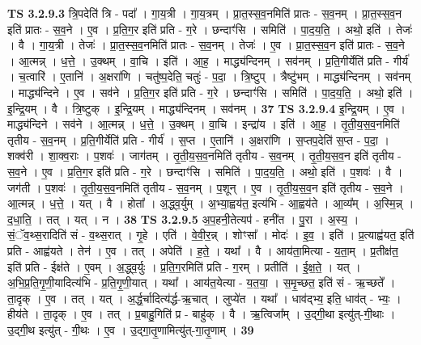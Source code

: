 \documentclass[17pt]{extarticle}
\begin{document}
                  \newline
                                \textbf{ TS 3.2.9.3} \newline
                  त्रि॒पदेति॑ त्रि - पदा᳚ । गा॒य॒त्री । गा॒य॒त्रम् । प्रा॒त॒स्स॒व॒नमिति॑ प्रातः - स॒व॒नम् । प्रा॒त॒स्स॒व॒न इति॑ प्रातः - स॒व॒ने । ए॒व । प्र॒ति॒ग॒र इति॑ प्रति - ग॒रे । छन्दाꣳ॑सि । समिति॑ । पा॒द॒य॒ति॒ । अथो॒ इति॑ । तेजः॑ । वै । गा॒य॒त्री । तेजः॑ । प्रा॒त॒स्स॒व॒नमिति॑ प्रातः - स॒व॒नम् । तेजः॑ । ए॒व । प्रा॒त॒स्स॒व॒न इति॑ प्रातः - स॒व॒ने । आ॒त्मन्न् । ध॒त्ते॒ । उ॒क्थम् । वा॒चि । इति॑ । आ॒ह॒ । माद्ध्य॑न्दिनम् । सव॑नम् । प्र॒ति॒गीर्येति॑ प्रति - गीर्य॑ । च॒त्वारि॑ । ए॒तानि॑ । अ॒क्षरा॑णि । चतु॑ष्प॒देति॒ चतुः॑ - प॒दा॒ । त्रि॒ष्टुप् । त्रैष्टु॑भम् । माद्ध्य॑न्दिनम् । सव॑नम् । माद्ध्य॑न्दिने । ए॒व । सव॑ने । प्र॒ति॒ग॒र इति॑ प्रति - ग॒रे । छन्दाꣳ॑सि । समिति॑ । पा॒द॒य॒ति॒ । अथो॒ इति॑ । इ॒न्द्रि॒यम् । वै । त्रि॒ष्टुक् । इ॒न्द्रि॒यम् । माद्ध्य॑न्दिनम् । सव॑नम् । \textbf{  37} \newline
                  \newline
                                \textbf{ TS 3.2.9.4} \newline
                  इ॒न्द्रि॒यम् । ए॒व । माद्ध्य॑न्दिने । सव॑ने । आ॒त्मन्न् । ध॒त्ते॒ । उ॒क्थम् । वा॒चि । इन्द्रा॑य । इति॑ । आ॒ह॒ । तृ॒ती॒य॒स॒व॒नमिति॑ तृतीय - स॒व॒नम् । प्र॒ति॒गीर्येति॑ प्रति - गीर्य॑ । स॒प्त । ए॒तानि॑ । अ॒क्षरा॑णि । स॒प्तप॒देति॑ स॒प्त - प॒दा॒ । शक्व॑री । शा॒क्व॒राः । प॒शवः॑ । जाग॑तम् । तृ॒ती॒य॒स॒व॒नमिति॑ तृतीय - स॒व॒नम् । तृ॒ती॒य॒स॒व॒न इति॑ तृतीय - स॒व॒ने । ए॒व । प्र॒ति॒ग॒र इति॑ प्रति - ग॒रे । छन्दाꣳ॑सि । समिति॑ । पा॒द॒य॒ति॒ । अथो॒ इति॑ । प॒शवः॑ । वै । जग॑ती । प॒शवः॑ । तृ॒ती॒य॒स॒व॒नमिति॑ तृतीय - स॒व॒नम् । प॒शून् । ए॒व । तृ॒ती॒य॒स॒व॒न इति॑ तृतीय - स॒व॒ने । आ॒त्मन्न् । ध॒त्ते॒ । यत् । वै । होता᳚ । अ॒द्ध्व॒र्युम् । अ॒भ्या॒ह्वय॑त॒ इत्य॑भि - आ॒ह्वय॑ते । आ॒व्य᳚म् । अ॒स्मि॒न्न् । द॒धा॒ति॒ । तत् । यत् । न । \textbf{  38} \newline
                  \newline
                                \textbf{ TS 3.2.9.5} \newline
                  अ॒प॒हनी॒तेत्यप॑ - हनी॑त । पु॒रा । अ॒स्य॒ । सं॒ॅव॒थ्स॒रादिति॑ सं - व॒थ्स॒रात् । गृ॒हे । एति॑ । वे॒वी॒र॒न्न् । शोꣳसा᳚ । मोदः॑ । इ॒व॒ । इति॑ । प्र॒त्याह्व॑यत॒ इति॑ प्रति - आह्व॑यते । तेन॑ । ए॒व । तत् । अपेति॑ । ह॒ते॒ । यथा᳚ । वै । आय॑ता॒मित्या - य॒ता॒म् । प्र॒तीक्ष॑त॒ इति॑ प्रति - ईक्ष॑ते । ए॒वम् । अ॒द्ध्व॒र्युः । प्र॒ति॒ग॒रमिति॑ प्रति - ग॒रम् । प्रतीति॑ । ई॒क्ष॒ते॒ । यत् । अ॒भि॒प्र॒ति॒गृ॒णी॒यादित्य॑भि - प्र॒ति॒गृ॒णी॒यात् । यथा᳚ । आय॑त॒येत्या - य॒त॒या॒ । स॒मृ॒च्छत॒ इति॑ सं - ऋ॒च्छते᳚ । ता॒दृक् । ए॒व । तत् । यत् । अ॒र्द्ध॒र्चादित्य॑र्द्ध-ऋ॒चात् । लुप्ये॑त । यथा᳚ । धाव॑द्भ्य॒ इति॒ धाव॑त् - भ्यः॒ । हीय॑ते । ता॒दृक् । ए॒व । तत् । प्र॒बाहु॒गिति॑ प्र - बाहु॑क् । वै । ऋ॒त्विजा᳚म् । उ॒द्गी॒था इत्यु॑त्-गी॒थाः । उ॒द्गी॒थ इत्यु॑त् - गी॒थः । ए॒व । उ॒द्गा॒तृ॒णामित्यु॑त्-गा॒तृ॒णाम् । \textbf{  39} \newline
\end{document}
